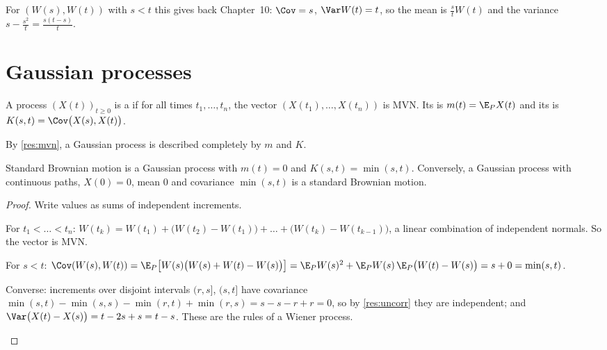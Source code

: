 For $(W(s),W(t))$ with $s<t$ this gives back Chapter~10: $\Cov=s$, $\Var W(t)=t$, so the mean is $\frac stW(t)$ and the variance $s-\frac{s^2}{t}=\frac{s(t-s)}{t}$.

\section{Gaussian processes}

\begin{definition}
A process $(X(t))_{t\ge0}$ is a  if for all times $t_1,\dots,t_n$, the vector $(X(t_1),\dots,X(t_n))$ is MVN. Its  is $m(t)=\E_PX(t)$ and its  is $K(s,t)=\Cov\big(X(s),X(t)\big)$.
\end{definition}

By \cref{res:mvn}, a Gaussian process is described completely by $m$ and $K$.

\begin{theorem}
\label{thm:bm-gauss}
Standard Brownian motion is a Gaussian process with $m(t)=0$ and $K(s,t)=\min(s,t)$. Conversely, a Gaussian process with continuous paths, $X(0)=0$, mean $0$ and covariance $\min(s,t)$ is a standard Brownian motion.
\end{theorem}
\begin{proof}
Write values as sums of independent increments.
\begin{steps}
  \item For $t_1<\dots<t_n$: $W(t_k)=W(t_1)+\big(W(t_2)-W(t_1)\big)+\dots+\big(W(t_k)-W(t_{k-1})\big)$, a linear combination of independent normals. So the vector is MVN.
  \item For $s<t$: $\Cov(W(s),W(t))=\E_P\big[W(s)\big(W(s)+W(t)-W(s)\big)\big]=\E_PW(s)^2+\E_PW(s)\,\E_P\big(W(t)-W(s)\big)=s+0=\min(s,t)$.
  \item Converse: increments over disjoint intervals $(r,s]$, $(s,t]$ have covariance $\min(s,t)-\min(s,s)-\min(r,t)+\min(r,s)=s-s-r+r=0$, so by \cref{res:uncorr} they are independent; and $\Var\big(X(t)-X(s)\big)=t-2s+s=t-s$. These are the rules of a Wiener process. \qedhere
\end{steps}
\end{proof}

\begin{pic}
\end{pic}

